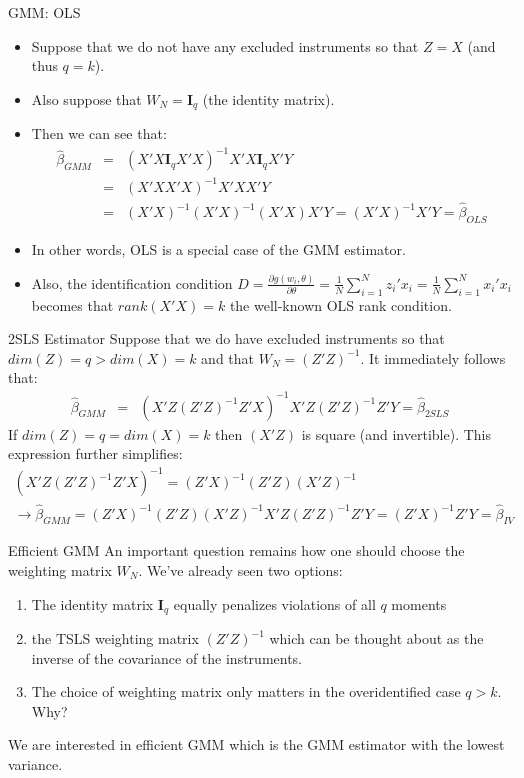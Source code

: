 \documentclass[aspectratio=169]{beamer}
\begin{document}
\begin{frame}{GMM: OLS}
\begin{itemize}
\item Suppose that we do not have any excluded instruments so that $Z=X$ (and thus $q=k$). 
\item Also suppose that $W_N = \mathbf{I}_q$ (the identity matrix). 
\item Then we can see that:
\begin{eqnarray*}
\hat{\beta}_{GMM} &=& (X'X \mathbf{I}_q X' X)^{-1} X' X \mathbf{I}_q X'Y\\
 &=& (X'X X' X)^{-1} X' X X'Y\\
 &=& (X'X)^{-1} (X' X)^{-1} (X' X) X'Y =  (X'X)^{-1} X'Y = \hat{\beta}_{OLS}
\end{eqnarray*}

\item In other words, OLS is a special case of the GMM estimator.
\item  Also, the identification condition $D=\frac{\partial g(w_i,\theta)}{\partial \theta} =\frac{1}{N} \sum_{i=1}^N z_i' x_i = \frac{1}{N} \sum_{i=1}^N x_i' x_i$ becomes that $rank(X'X) = k$ the well-known OLS rank condition.\\
\end{itemize}
\end{frame}

\begin{frame}{2SLS Estimator}
Suppose that we do have excluded instruments so that $dim(Z) = q > dim(X) = k$ and that $W_N = (Z'Z)^{-1}$. It immediately follows that:
\begin{eqnarray*}
\hat{\beta}_{GMM} &=& (X'Z (Z'Z)^{-1} Z' X)^{-1} X' Z (Z'Z)^{-1} Z'Y = \hat{\beta}_{2SLS}
\end{eqnarray*}
If $dim(Z) = q = dim(X) = k$ then $(X'Z)$ is square (and invertible). This expression further simplifies:
\begin{eqnarray*}
(X'Z (Z'Z)^{-1} Z' X)^{-1} = (Z'X)^{-1} (Z'Z) (X'Z)^{-1}\\
\rightarrow \hat{\beta}_{GMM} = (Z'X)^{-1} (Z'Z) (X'Z)^{-1}  X' Z (Z'Z)^{-1} Z'Y = (Z'X)^{-1} Z'Y = \hat{\beta}_{IV}
\end{eqnarray*}
\end{frame}

\begin{frame}{Efficient GMM}
An important question remains how one should choose the weighting matrix $W_N$. We've already seen two options: 
\begin{enumerate}
\item The identity matrix $\mathbf{I}_q$ equally penalizes violations of all $q$ moments
\item  the TSLS weighting matrix $(Z'Z)^{-1}$ which can be thought about as the inverse of the covariance of the instruments. 
\item The choice of weighting matrix only matters in the \alert{overidentified} case $q > k$. Why?
\end{enumerate}
We are interested in \alert{efficient GMM} which is the GMM estimator with the lowest variance.

\end{frame}
\end{document}
